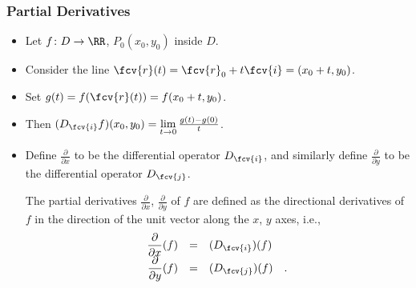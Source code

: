 \begin{frame}
\frametitle{Partial Derivatives}
\begin{itemize}
\item Let $f\colon D \to \RR$,  $P_0(x_0,y_0)$ inside $D$.
\item<2-> Consider the line $\fcv{r}(t) = \fcv{r}_0 + t\fcv {i} = ( x_0+t, y_0 )$.
\item<3-> Set $g(t) = f(\fcv{r}(t)) = f(x_0+t, y_0)$.
\item<4-> Then $(D_{\fcv{i}} f)(x_0,y_0) = \lim\limits_{t\to 0} \frac{g(t)-g(0)}{t}$.
\item<5-> Define $ \frac{\partial}{\partial x}$ to be the differential operator $ D_{\fcv{i}}$, and similarly define $ \frac{\partial}{\partial y}$ to be the differential operator $ D_{\fcv{j}}$.

\begin{definition}
The partial derivatives $\frac{\partial}{\partial x} $, $\frac{\partial}{\partial y} $  of $f$ are defined as the directional derivatives of $f$ in the direction of the unit vector along the $x$, $y$ axes, i.e.,
\[
\begin{array}{rcl}
\displaystyle\frac{\partial}{\partial x}(f)&=&(D_{\fcv{i}})(f)\\
\displaystyle\frac{\partial}{\partial y}(f)&=&(D_{\fcv{j}})(f)\quad .
\end{array}
\]
\end{definition}
\end{itemize}
\end{frame}
